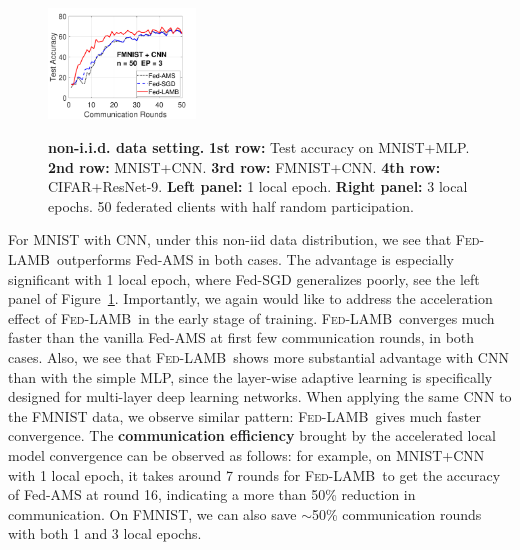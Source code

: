 \documentclass[11pt]{article}
\newcommand{\algo}{\textsc{Fed-LAMB}}
\begin{document}
\begin{figure}[t!]
\begin{center}
{        \hspace{-0.1in}\includegraphics[width=0.35\textwidth]{new_fmnist_mnist_fig/fmnist_testerror_cnn_ep3_iid0.pdf}
        }
    \end{center}
    \vspace{0.05in}
	\caption{\textbf{non-i.i.d. data setting.} \textbf{1st row:} Test accuracy on MNIST+MLP. 
	\textbf{2nd row:} MNIST+CNN.  \textbf{3rd row:} FMNIST+CNN.
	\textbf{4th row:} CIFAR+ResNet-9.
	\textbf{Left panel:} 1 local epoch. \textbf{Right panel:} 3 local epochs. 50 federated clients with half random participation.}
	\label{fig:noniid}
	\vspace{-0.1in}
\end{figure}


For MNIST with CNN, under this non-iid data distribution, we see that \algo\ outperforms Fed-AMS in both cases. The advantage is especially significant with 1 local epoch, where Fed-SGD generalizes poorly, see the left panel of Figure~\ref{fig:noniid}. 
Importantly, we again would like to address the acceleration effect of \algo\, in the early stage of training. \algo\ converges much faster than the vanilla Fed-AMS at first few communication rounds, in both cases. 
Also, we see that \algo\ shows more substantial advantage with CNN than with the simple MLP, since the layer-wise adaptive learning is specifically designed for multi-layer deep learning networks. When applying the same CNN to the FMNIST data, we observe similar pattern: \algo\ gives much faster convergence. The \textbf{communication efficiency} brought by the accelerated local model convergence can be observed as follows: for example, on MNIST+CNN with 1 local epoch, it takes around 7 rounds for \algo\ to get the accuracy of Fed-AMS at round 16, indicating a more than 50\% reduction in communication. On FMNIST, we can also save $\sim$50\% communication rounds with both 1 and 3 local epochs.
\end{document}
